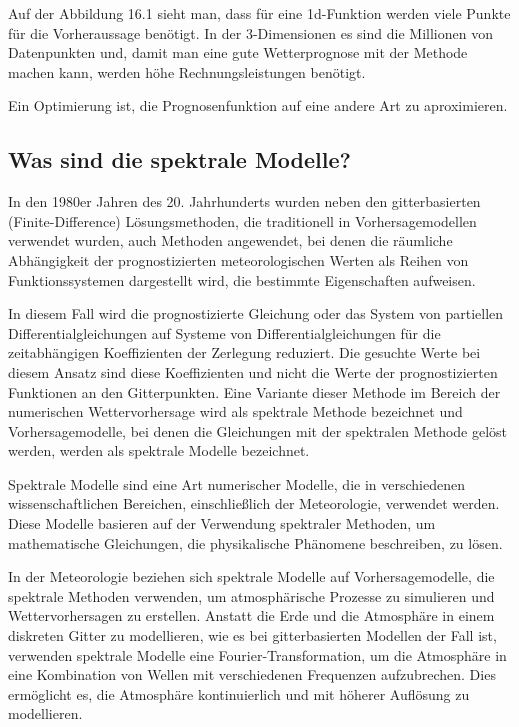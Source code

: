 Auf der Abbildung 16.1 sieht man, dass für eine 1d-Funktion werden viele Punkte für die Vorheraussage benötigt. In der 3-Dimensionen es sind die Millionen von Datenpunkten und, damit man eine gute Wetterprognose mit der Methode machen kann, werden höhe Rechnungsleistungen benötigt.

Ein Optimierung ist, die Prognosenfunktion auf eine andere Art zu aproximieren.

\subsection{Was sind die spektrale Modelle?
\label{spektral:subsection:spektralemodelle}}
In den 1980er Jahren des 20. Jahrhunderts wurden neben den gitterbasierten (Finite-Difference) Lösungsmethoden, die traditionell in Vorhersagemodellen verwendet wurden, auch Methoden angewendet, bei denen die räumliche Abhängigkeit der prognostizierten meteorologischen Werten als Reihen von Funktionssystemen dargestellt wird, die bestimmte Eigenschaften aufweisen.

In diesem Fall wird die prognostizierte Gleichung oder das System von partiellen Differentialgleichungen auf Systeme von Differentialgleichungen für die zeitabhängigen Koeffizienten der Zerlegung reduziert.
Die gesuchte Werte bei diesem Ansatz sind diese Koeffizienten und nicht die Werte der prognostizierten Funktionen an den Gitterpunkten. 
Eine Variante dieser Methode im Bereich der numerischen Wettervorhersage wird als spektrale Methode bezeichnet und Vorhersagemodelle, bei denen die Gleichungen mit der spektralen Methode gelöst werden, werden als spektrale Modelle bezeichnet.

Spektrale Modelle sind eine Art numerischer Modelle, die in verschiedenen wissenschaftlichen Bereichen, einschließlich der Meteorologie, verwendet werden.
Diese Modelle basieren auf der Verwendung spektraler Methoden, um mathematische Gleichungen, die physikalische Phänomene beschreiben, zu lösen.

In der Meteorologie beziehen sich spektrale Modelle auf Vorhersagemodelle, die spektrale Methoden verwenden, um atmosphärische Prozesse zu simulieren und Wettervorhersagen zu erstellen.
Anstatt die Erde und die Atmosphäre in einem diskreten Gitter zu modellieren, wie es bei gitterbasierten Modellen der Fall ist, verwenden spektrale Modelle eine Fourier-Transformation, um die Atmosphäre in eine Kombination von Wellen mit verschiedenen Frequenzen aufzubrechen.
Dies ermöglicht es, die Atmosphäre kontinuierlich und mit höherer Auflösung zu modellieren.


